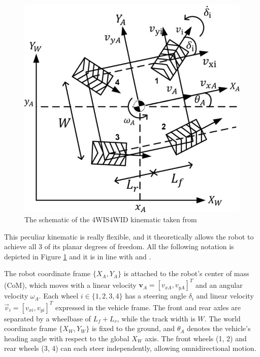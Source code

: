 \documentclass[11pt,a4paper,twocolumn]{article}
\begin{document}
\begin{figure}
    \centering
    \includegraphics[width=1\linewidth]{Multidisciplinary_Project_Report/Images/4WISskematic.png}
    \caption{The schematic of the 4WIS4WID kinematic taken from \cite{4WISschematic}}
    \label{fig:4WIS}
\end{figure}

This peculiar kinematic is really flexible, and it theoretically allows the robot to achieve all 3 of its planar degrees of freedom. All the following notation is depicted in Figure \ref{fig:4WIS} and it is in line with \cite{4WIS4WID} and \cite{4WISschematic}.

The robot coordinate frame $\{X_A, Y_A\}$ is attached to the robot's center of mass (CoM), which moves with a linear velocity $\mathbf{v}_A = [v_{xA}, v_{yA}]^T$ and an angular velocity $\omega_A$. 
Each wheel $i \in \{1, 2, 3, 4\}$ has a steering angle $\delta_i$ and linear velocity $\vec{v}_i = [v_{xi}, v_{yi}]^T$ expressed in the vehicle frame. 
The front and rear axles are separated by a wheelbase of $L_f + L_r$, while the track width is $W$. 
The world coordinate frame $\{X_W, Y_W\}$ is fixed to the ground, and $\theta_A$ denotes the vehicle's heading angle with respect to the global $X_W$ axis. 
The front wheels (1, 2) and rear wheels (3, 4) can each steer independently, allowing omnidirectional motion.
\end{document}
